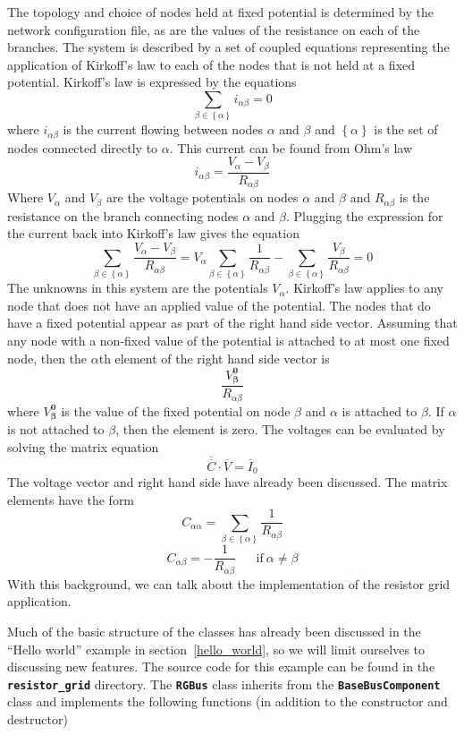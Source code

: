 The topology and choice of nodes held at fixed potential is determined by the network configuration file, as are the values of the resistance on each of the branches. The system is described by a set of coupled equations representing the application of Kirkoff's law to each of the nodes that is not held at a fixed potential. Kirkoff's law is expressed by the equations\[\sum_{\beta \in \left\{\alpha \right\}}{i_{\alpha \beta }=0}\] 
where $i_{\alpha \beta }$ is the current flowing between nodes $\alpha $ and $\beta $ and $\left\{\alpha \right\}$ is the set of nodes connected directly to $\alpha $. This current can be found from Ohm's law
\[i_{\alpha \beta }=\frac{V_{\alpha }-V_{\beta }}{R_{\alpha \beta }}\] 
Where $V_{\alpha }$ and $V_{\beta }$ are the voltage potentials on nodes $\alpha $ and $\beta $ and $R_{\alpha \beta }$ is the resistance on the branch connecting nodes $\alpha $ and $\beta $. Plugging the expression for the current back into Kirkoff's law gives the equation
\[\sum_{\beta \in \left\{\alpha \right\}}{\frac{V_{\alpha }-V_{\beta }}{R_{\alpha \beta }}=V_{\alpha }\sum_{\beta \in \left\{\alpha \right\}}{\frac{1}{R_{\alpha \beta }}}-\sum_{\beta \in \left\{\alpha \right\}}{\frac{V_{\beta }}{R_{\alpha \beta }}}=0}\] 
The unknowns in this system are the potentials $V_{\alpha }$. Kirkoff's law applies to any node that does not have an applied value of the potential. The nodes that do have a fixed potential appear as part of the right hand side vector. Assuming that any node with a non-fixed value of the potential is attached to at most one fixed node, then the $\alpha $th element of the right hand side vector is
\[\frac{V^{\boldsymbol{0}}_{\boldsymbol{\beta }}}{R_{\alpha \beta }}\] 
where $V^{\boldsymbol{0}}_{\boldsymbol{\beta }}$ is the value of the fixed potential on node $\beta $ and $\alpha $ is attached to $\beta $. If $\alpha $ is not attached to $\beta $, then the element is zero. The voltages can be evaluated by solving the matrix equation
\[\overline{\overline{C}}\cdot \overline{V}={\overline{I}}_0\] 
The voltage vector and right hand side have already been discussed. The matrix elements have the form
\[
C_{\alpha \alpha }=\sum_{\beta \in \left\{\alpha \right\}}{\frac{1}{R_{\alpha \beta }}}
\]
\[
C_{\alpha \beta }=-\frac{1}{R_{\alpha \beta }}\ \mathrm{\;\;\;\;\;if}\ \alpha \neq \beta
\] 
With this background, we can talk about the implementation of the resistor grid application.

Much of the basic structure of the classes has already been discussed in
the ``Hello world'' example in section~\ref{hello_world}, so we will limit ourselves to discussing new features. The source code for this example can be found in the \texttt{\textbf{resistor\_grid}} directory. The \texttt{\textbf{RGBus}} class inherits from the \texttt{\textbf{BaseBusComponent}} class and implements the following functions (in addition to the constructor and destructor)

